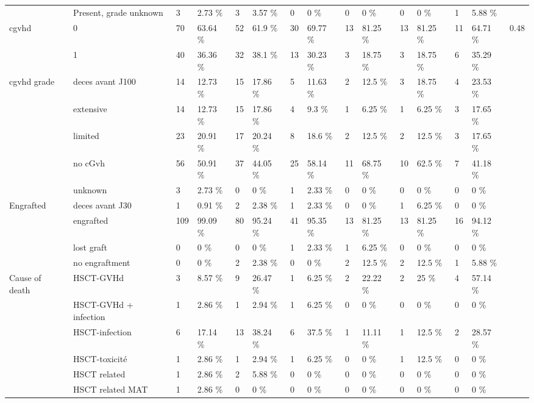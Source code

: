 \documentclass[a4paper,11pt] {article}
\begin{document}
\begin{landscape}
\begin{longtable}{lllllllllllllll}
   & Present, grade unknown & 3 & 2.73 \% & 3 & 3.57 \% & 0 & 0 \% & 0 & 0 \% & 0 & 0 \% & 1 & 5.88 \% &  \\ 
  cgvhd & 0 & 70 & 63.64 \% & 52 & 61.9 \% & 30 & 69.77 \% & 13 & 81.25 \% & 13 & 81.25 \% & 11 & 64.71 \% & 0.48 \\ 
   & 1 & 40 & 36.36 \% & 32 & 38.1 \% & 13 & 30.23 \% & 3 & 18.75 \% & 3 & 18.75 \% & 6 & 35.29 \% &  \\ 
  cgvhd grade & deces avant J100 & 14 & 12.73 \% & 15 & 17.86 \% & 5 & 11.63 \% & 2 & 12.5 \% & 3 & 18.75 \% & 4 & 23.53 \% &  \\ 
   & extensive & 14 & 12.73 \% & 15 & 17.86 \% & 4 & 9.3 \% & 1 & 6.25 \% & 1 & 6.25 \% & 3 & 17.65 \% &  \\ 
   & limited & 23 & 20.91 \% & 17 & 20.24 \% & 8 & 18.6 \% & 2 & 12.5 \% & 2 & 12.5 \% & 3 & 17.65 \% &  \\ 
   & no cGvh & 56 & 50.91 \% & 37 & 44.05 \% & 25 & 58.14 \% & 11 & 68.75 \% & 10 & 62.5 \% & 7 & 41.18 \% &  \\ 
   & unknown & 3 & 2.73 \% & 0 & 0 \% & 1 & 2.33 \% & 0 & 0 \% & 0 & 0 \% & 0 & 0 \% &  \\ 
  Engrafted & deces avant J30 & 1 & 0.91 \% & 2 & 2.38 \% & 1 & 2.33 \% & 0 & 0 \% & 1 & 6.25 \% & 0 & 0 \% &  \\ 
   & engrafted & 109 & 99.09 \% & 80 & 95.24 \% & 41 & 95.35 \% & 13 & 81.25 \% & 13 & 81.25 \% & 16 & 94.12 \% &  \\ 
   & lost graft & 0 & 0 \% & 0 & 0 \% & 1 & 2.33 \% & 1 & 6.25 \% & 0 & 0 \% & 0 & 0 \% &  \\ 
   & no engraftment & 0 & 0 \% & 2 & 2.38 \% & 0 & 0 \% & 2 & 12.5 \% & 2 & 12.5 \% & 1 & 5.88 \% &  \\ 
  Cause of death & HSCT-GVHd & 3 & 8.57 \% & 9 & 26.47 \% & 1 & 6.25 \% & 2 & 22.22 \% & 2 & 25 \% & 4 & 57.14 \% &  \\ 
   & HSCT-GVHd + infection & 1 & 2.86 \% & 1 & 2.94 \% & 1 & 6.25 \% & 0 & 0 \% & 0 & 0 \% & 0 & 0 \% &  \\ 
   & HSCT-infection & 6 & 17.14 \% & 13 & 38.24 \% & 6 & 37.5 \% & 1 & 11.11 \% & 1 & 12.5 \% & 2 & 28.57 \% &  \\ 
   & HSCT-toxicité & 1 & 2.86 \% & 1 & 2.94 \% & 1 & 6.25 \% & 0 & 0 \% & 1 & 12.5 \% & 0 & 0 \% &  \\ 
   & HSCT related & 1 & 2.86 \% & 2 & 5.88 \% & 0 & 0 \% & 0 & 0 \% & 0 & 0 \% & 0 & 0 \% &  \\ 
   & HSCT related MAT & 1 & 2.86 \% & 0 & 0 \% & 0 & 0 \% & 0 & 0 \% & 0 & 0 \% & 0 & 0 \% &  \\ 

\end{longtable}
\end{landscape}
\end{document}
